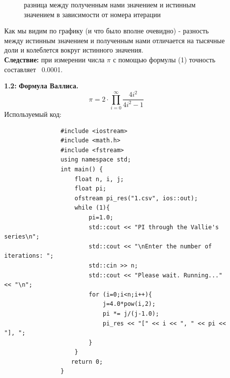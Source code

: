 \documentclass[a4paper, 12pt]{article}
\begin{document}
\begin{enumerate}
\begin{enumerate}
\begin{figure}[h!]
    			            \caption{разница между полученным нами значением и истинным значением в зависимости от номера итерации}
    			            \label{fig:my_label}
    		          \end{figure}
                        \bigskip 
                        Как мы видим по графику (и что было вполне очевидно) - разность между истинным значением и полученным нами отличается на тысячные доли и колеблется вокруг истинного значения.
                        \[\]
                        \textbf{Следствие:} при измерении числа $\pi$ с помощью формулы (1) точность составляет ~0.0001.
                        \bigskip
                        
                    \newpage
                    \item[\textbf{1.2: }]  \textbf{Формула Валлиса.}
                            \begin{equation}
                                \pi = 2 \cdot \prod\limits_{i=0}^{\infty} \frac{4i^2}{4i^2-1}
                            \end{equation}
                            Используемый код:
                            \begin{lstlisting}
                #include <iostream>
                #include <math.h>
                #include <fstream>
                using namespace std;            
                int main() {
                    float n, i, j;
                    float pi;
                    ofstream pi_res("1.csv", ios::out);
                    while (1){
                        pi=1.0;                            
                        std::cout << "PI through the Vallie's series\n";
                        std::cout << "\nEnter the number of iterations: ";
                        std::cin >> n;
                        std::cout << "Please wait. Running..." << "\n";
                        for (i=0;i<n;i++){
                            j=4.0*pow(i,2);
                            pi *= j/(j-1.0);
                            pi_res << "[" << i << ", " << pi << "], ";
                        }
                    }
                   return 0;
                }
                                                        
                            \end{lstlisting}
        

\end{enumerate}
\end{enumerate}
\end{document}
